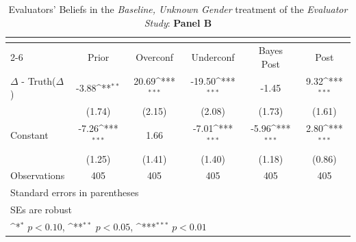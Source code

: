 \begin{table}[htbp]\centering
\def\sym#1{\ifmmode^{#1}\else\(^{#1}\)\fi}
\caption{Evaluators' Beliefs in the \textit{Baseline, Unknown Gender} treatment of the \textit{Evaluator Study}: \textbf{Panel B}}
\begin{tabular}{l*{5}{c}}
\hline\hline
                &\multicolumn{5}{c}{}                                                                          \\\cmidrule(lr){2-6}
                &\multicolumn{1}{c}{Prior}&\multicolumn{1}{c}{Overconf}&\multicolumn{1}{c}{Underconf}&\multicolumn{1}{c}{Bayes Post}&\multicolumn{1}{c}{Post}\\
\hline
$\Delta$ - Truth($\Delta$)&    -3.88\sym{**} &    20.69\sym{***}&   -19.50\sym{***}&    -1.45         &     9.32\sym{***}\\
                &   (1.74)         &   (2.15)         &   (2.08)         &   (1.73)         &   (1.61)         \\
Constant        &    -7.26\sym{***}&     1.66         &    -7.01\sym{***}&    -5.96\sym{***}&     2.80\sym{***}\\
                &   (1.25)         &   (1.41)         &   (1.40)         &   (1.18)         &   (0.86)         \\
\hline
Observations    &      405         &      405         &      405         &      405         &      405         \\
\hline\hline
\multicolumn{6}{l}{\footnotesize Standard errors in parentheses}\\
\multicolumn{6}{l}{\footnotesize SEs are robust}\\
\multicolumn{6}{l}{\footnotesize \sym{*} \(p<0.10\), \sym{**} \(p<0.05\), \sym{***} \(p<0.01\)}\\
\end{tabular}
\end{table}
